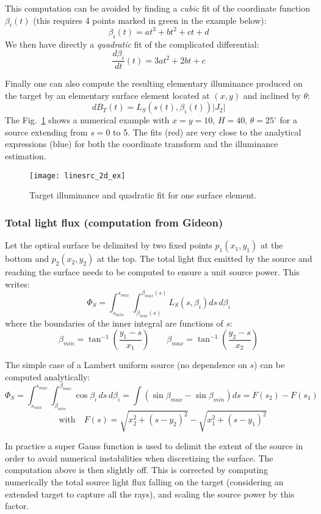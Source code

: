 This computation can be avoided by finding a \emph{cubic} 
fit of the coordinate function 
$\beta_i(t)$ (this
requires 4 points marked in green in the example below):
\[ \beta_i(t) = at^3+bt^2+ct +d \]
We then have directly
a \emph{quadratic} fit of the complicated differential:
\[\frac{d\beta_i}{dt}(t) = 3at^2+2bt + c \]

Finally one can also compute the resulting elementary illuminance
produced on the target by an elementary surface element
located at $(x,y)$ and inclined by $\theta$:
\[ dB_T(t) = L_S(s(t), \beta_i(t)) |J_2| \]
The Fig.~\ref{fig:irr_one_element} shows a numerical example with $x = y = 10$, 
$H = 40$, $\theta=25^\circ$ for a source extending from $s=0$ 
to 5.
The fits (red) are very close to the analytical expressions (blue) for both
the coordinate transform and the illuminance estimation.

\begin{figure}
\centering
\texttt{[image: linesrc\_2d\_ex]} 
\caption{Target illuminance and quadratic fit for one surface
element.}
\label{fig:irr_one_element}
\end{figure}

\subsubsection*{Total light flux (computation from Gideon)}
Let the optical surface be delimited by two fixed 
points $p_1(x_1, y_1)$ at the bottom and $p_2(x_2, y_2)$ at the top.
The total light flux emitted by the source and reaching the surface needs
to be computed to ensure a unit source power.
This writes:
\begin{equation}
\label{eq:power_scale}
 \Phi_S  
= \int_{s_{min}}^{s_{max}} \int_{\beta_{min}(s)}^{\beta_{max}(s)} 
     L_S(s,\beta_i)ds\,d\beta_i
\end{equation}
where the boundaries of the inner integral are functions of $s$:
\[ \beta_{min} = \tan^{-1}\left(\frac{y_1-s}{x_1}\right) \quad\quad 
   \beta_{max} = \tan^{-1}\left(\frac{y_2-s}{x_2}\right)\]

The simple case of a Lambert uniform source (no dependence on $s$) can be computed 
analytically:
\[ \Phi_S  
= \int_{s_{min}}^{s_{max}} \int_{\beta_{min}}^{\beta_{max}} 
      \cos\beta_i\,ds\,d\beta_i = \int (\sin\beta_{max} - \sin\beta_{min})ds
 = F(s_2) - F(s_1)
    \]
\[  \quad\text{with}\quad
  F(s) = \sqrt{x_2^2  + (s-y_2)^2} - \sqrt{x_1^2  + (s-y_1)^2} \]

In practice a super Gauss function is used to delimit the extent of the source
in order to avoid numerical instabilities when discretizing the surface.
The computation above is then slightly off. This is corrected by computing
numerically the total source light flux falling on the target (considering
an extended target to capture all the rays), and scaling the source power
by this factor.

